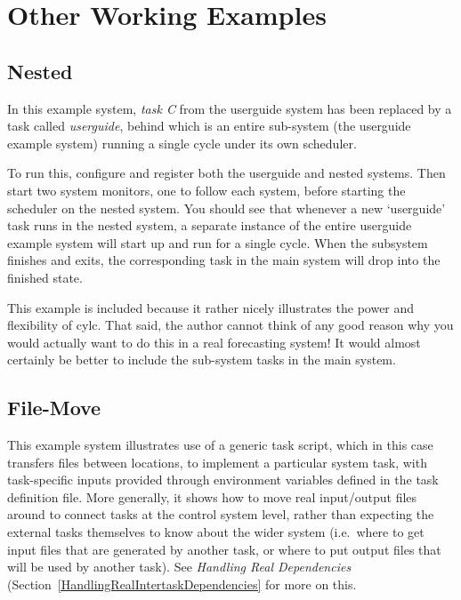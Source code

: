 \documentclass[11pt,a4paper]{article}
\begin{document}
\pagebreak


\section{Other Working Examples}
\label{OtherWorkingExamples}

\subsection{Nested}

In this example system, {\em task C} from the userguide system has been
replaced by a task called {\em userguide}, behind which is an entire
sub-system (the userguide example system) running a single cycle under
its own scheduler.

To run this, configure and register both the userguide and nested
systems. Then start two system monitors, one to follow each system,
before starting the scheduler on the nested system. You should see that 
whenever a new `userguide' task runs in the nested system, a separate
instance of the entire userguide example system will start up and run
for a single cycle. When the subsystem finishes and exits, the
corresponding task in the main system will drop into the finished state.

This example is included because it rather nicely illustrates the power
and flexibility of cylc. That said, the author cannot think of any good
reason why you would actually want to do this in a real forecasting
system! It would almost certainly be better to include the sub-system
tasks in the main system.

\subsection{File-Move}

This example system illustrates use of a generic task script, which in
this case transfers files between locations, to implement a particular
system task, with task-specific inputs provided through environment
variables defined in the task definition file.  More generally, it shows
how to move real input/output files around to connect tasks at the
control system level, rather than expecting the external tasks
themselves to know about the wider system (i.e.\ where to get input
files that are generated by another task, or where to put output files
that will be used by another task).  See {\em Handling Real
Dependencies} (Section~\ref{HandlingRealIntertaskDependencies} for more
on this.
\end{document}
